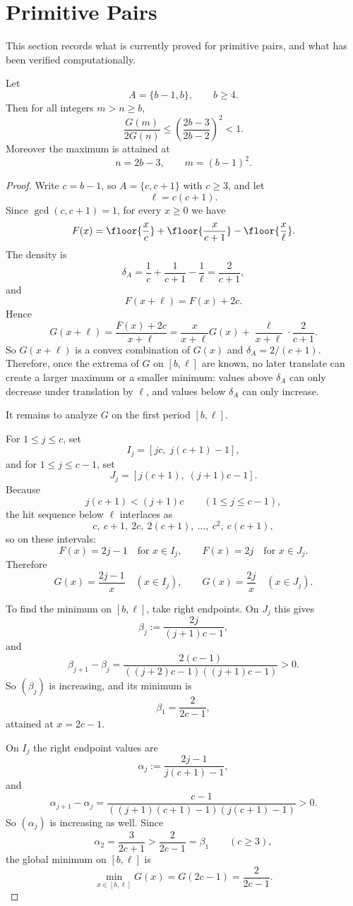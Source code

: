 \section{Primitive Pairs}

This section records what is currently proved for primitive pairs, and what has
been verified computationally.

\begin{theorem}\label{thm:adjacent-pairs}
Let
\[
A=\{b-1,b\}, \qquad b\ge 4.
\]
Then for all integers $m>n\ge b$,
\[
\frac{G(m)}{2G(n)}\le \left(\frac{2b-3}{2b-2}\right)^2<1.
\]
Moreover the maximum is attained at
\[
n=2b-3,\qquad m=(b-1)^2.
\]
\end{theorem}

\begin{proof}
Write $c=b-1$, so $A=\{c,c+1\}$ with $c\ge 3$, and let
\[
\ell=c(c+1).
\]
Since $\gcd(c,c+1)=1$, for every $x\ge 0$ we have
\[
F(x)=\floor{\frac{x}{c}}+\floor{\frac{x}{c+1}}-\floor{\frac{x}{\ell}}.
\]
The density is
\[
\delta_A=\frac{1}{c}+\frac{1}{c+1}-\frac{1}{\ell}=\frac{2}{c+1},
\]
and
\[
F(x+\ell)=F(x)+2c.
\]
Hence
\[
G(x+\ell)=\frac{F(x)+2c}{x+\ell}
=\frac{x}{x+\ell}G(x)+\frac{\ell}{x+\ell}\cdot \frac{2}{c+1}.
\]
So $G(x+\ell)$ is a convex combination of $G(x)$ and $\delta_A=2/(c+1)$.
Therefore, once the extrema of $G$ on $[b,\ell]$ are known, no later translate
can create a larger maximum or a smaller minimum: values above $\delta_A$ can
only decrease under translation by $\ell$, and values below $\delta_A$ can only
increase.

It remains to analyze $G$ on the first period $[b,\ell]$.

For $1\le j\le c$, set
\[
I_j=[jc,\; j(c+1)-1],
\]
and for $1\le j\le c-1$, set
\[
J_j=[j(c+1),\; (j+1)c-1].
\]
Because
\[
j(c+1)<(j+1)c \qquad (1\le j\le c-1),
\]
the hit sequence below $\ell$ interlaces as
\[
c,\ c+1,\ 2c,\ 2(c+1),\ \ldots,\ c^2,\ c(c+1),
\]
so on these intervals:
\[
F(x)=2j-1 \quad \text{for } x\in I_j,
\qquad
F(x)=2j \quad \text{for } x\in J_j.
\]
Therefore
\[
G(x)=\frac{2j-1}{x}\quad (x\in I_j),\qquad
G(x)=\frac{2j}{x}\quad (x\in J_j).
\]

To find the minimum on $[b,\ell]$, take right endpoints. On $J_j$ this gives
\[
\beta_j:=\frac{2j}{(j+1)c-1},
\]
and
\[
\beta_{j+1}-\beta_j
=\frac{2(c-1)}{((j+2)c-1)((j+1)c-1)}>0.
\]
So $(\beta_j)$ is increasing, and its minimum is
\[
\beta_1=\frac{2}{2c-1},
\]
attained at $x=2c-1$.

On $I_j$ the right endpoint values are
\[
\alpha_j:=\frac{2j-1}{j(c+1)-1},
\]
and
\[
\alpha_{j+1}-\alpha_j
=\frac{c-1}{((j+1)(c+1)-1)(j(c+1)-1)}>0.
\]
So $(\alpha_j)$ is increasing as well. Since
\[
\alpha_2=\frac{3}{2c+1}>\frac{2}{2c-1}=\beta_1
\qquad (c\ge 3),
\]
the global minimum on $[b,\ell]$ is
\[
\min_{x\in [b,\ell]} G(x)=G(2c-1)=\frac{2}{2c-1}.
\]


\end{proof}
